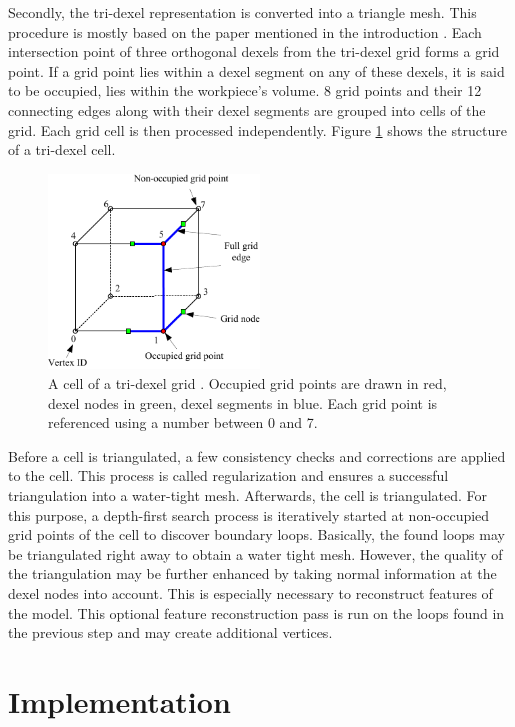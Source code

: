 Secondly, the tri-dexel representation is converted into a triangle mesh.
This procedure is mostly based on the paper mentioned in the introduction \cite{tridexel_reconstruction}.
Each intersection point of three orthogonal dexels from the tri-dexel grid forms a grid point.
If a grid point lies within a dexel segment on any of these dexels, it is said to be occupied, \ie lies within the workpiece's volume.
8 grid points and their 12 connecting edges along with their dexel segments are grouped into cells of the grid.
Each grid cell is then processed independently.
Figure \ref{fig:tri_dexel_cell} shows the structure of a tri-dexel cell.
%
\begin{figure}
	\centering
	\includegraphics[width=0.5\textwidth]{images/tri_dexel_cell}
	\caption{
		A cell of a tri-dexel grid \cite{tridexel_reconstruction}.
		Occupied grid points are drawn in red, dexel nodes in green, dexel segments in blue.
		Each grid point is referenced using a number between 0 and 7.
	}
	\label{fig:tri_dexel_cell}
\end{figure}
%
Before a cell is triangulated, a few consistency checks and corrections are applied to the cell.
This process is called regularization and ensures a successful triangulation into a water-tight mesh.
Afterwards, the cell is triangulated.
For this purpose, a depth-first search process is iteratively started at non-occupied grid points of the cell to discover boundary loops.
Basically, the found loops may be triangulated right away to obtain a water tight mesh.
However, the quality of the triangulation may be further enhanced by taking normal information at the dexel nodes into account.
This is especially necessary to reconstruct features of the model.
This optional feature reconstruction pass is run on the loops found in the previous step and may create additional vertices.

\section{Implementation}
\label{sec:tri_dexel_implementation}

